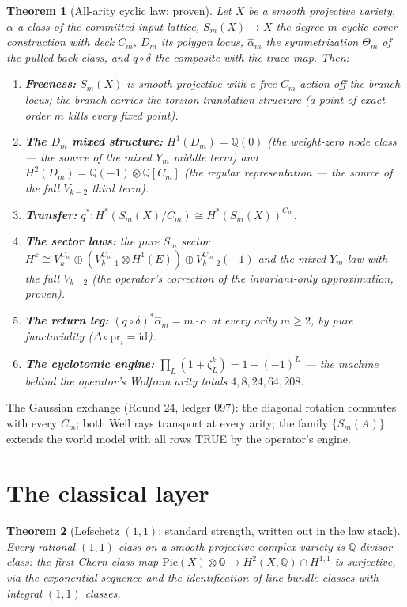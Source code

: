 \documentclass[11pt]{article}
\newcommand{\Q}{\mathbb Q}
\newcommand{\cyc}{C_m}
\newtheorem{theorem}{Theorem}[section]
\begin{document}
\begin{theorem}[All-arity cyclic law; proven]\label{thm:arity}
Let $X$ be a smooth projective variety, $\alpha$ a class of the committed
input lattice, $S_m(X)\to X$ the degree-$m$ cyclic cover construction with
deck $\cyc$, $D_m$ its polygon locus, $\widehat{\alpha}_m$ the symmetrization
$\Theta_m$ of the pulled-back class, and $q\circ\delta$ the composite with
the trace map. Then:
\begin{enumerate}
\item \textbf{Freeness:} $S_m(X)$ is smooth projective with a free
$\cyc$-action off the branch locus; the branch carries the torsion
translation structure (a point of exact order $m$ kills every fixed point).
\item \textbf{The $D_m$ mixed structure:}
$H^1(D_m)=\Q(0)$ (the weight-zero node class --- the source of the mixed
$Y_m$ middle term) and $H^2(D_m)=\Q(-1)\otimes\Q[\cyc]$ (the regular
representation --- the source of the full $V_{k-2}$ third term).
\item \textbf{Transfer:} $q^\ast\colon H^\ast(S_m(X)/\cyc)\cong
H^\ast(S_m(X))^{\cyc}$.
\item \textbf{The sector laws:} the pure $S_m$ sector
$H^k\cong V_k^{\cyc}\oplus(V_{k-1}^{\cyc}\otimes H^1(E))\oplus V_{k-2}^{\cyc}(-1)$
and the mixed $Y_m$ law with the \emph{full} $V_{k-2}$ (the operator's
correction of the invariant-only approximation, proven).
\item \textbf{The return leg:} $(q\circ\delta)^\ast\widehat{\alpha}_m=m\cdot\alpha$
at every arity $m\ge2$, by pure functoriality
($\Delta\circ\mathrm{pr}_i=\mathrm{id}$).
\item \textbf{The cyclotomic engine:} $\prod_{L}(1+\zeta_L^{k})=1-(-1)^{L}$
--- the machine behind the operator's Wolfram arity totals
$4,8,24,64,208$.
\end{enumerate}
\end{theorem}

The Gaussian exchange (Round 24, ledger 097): the diagonal rotation
commutes with every $\cyc$; both Weil rays transport at every arity; the
family $\{S_m(A)\}$ extends the world model with all rows TRUE by the
operator's engine.

\section{The classical layer}\label{sec:classical}

\begin{theorem}[Lefschetz $(1,1)$; standard strength, written out in the
law stack]
Every rational $(1,1)$ class on a smooth projective complex variety is
$\Q$-divisor class: the first Chern class map
$\mathrm{Pic}(X)\otimes\Q\to H^2(X,\Q)\cap H^{1,1}$ is surjective, via the
exponential sequence and the identification of line-bundle classes with
integral $(1,1)$ classes.
\end{theorem}
\end{document}
